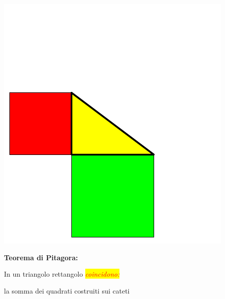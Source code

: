 \documentclass[12pt,italian,oneside]{report}
\newcommand{\rosso}[1]{\textcolor{red}{#1}}
\newcommand{\sfondogiallo}[1]{\colorbox{yellow}{#1}}
\begin{document}
\begin{center}
\includegraphics[scale=1.2]{pitagora2}
\end{center}

\begin{firstheadlineitemize}

\item \textbf{Teorema di Pitagora:}

\begin{secondheadlineitemize}

\item  In un triangolo rettangolo \sfondogiallo{\rosso{\textit{coincidono:}}}

\begin{thirdheadlineitemize}

\item la somma dei quadrati costruiti sui cateti

\end{thirdheadlineitemize}

\end{secondheadlineitemize}

\end{firstheadlineitemize}

\newframe
\end{document}
